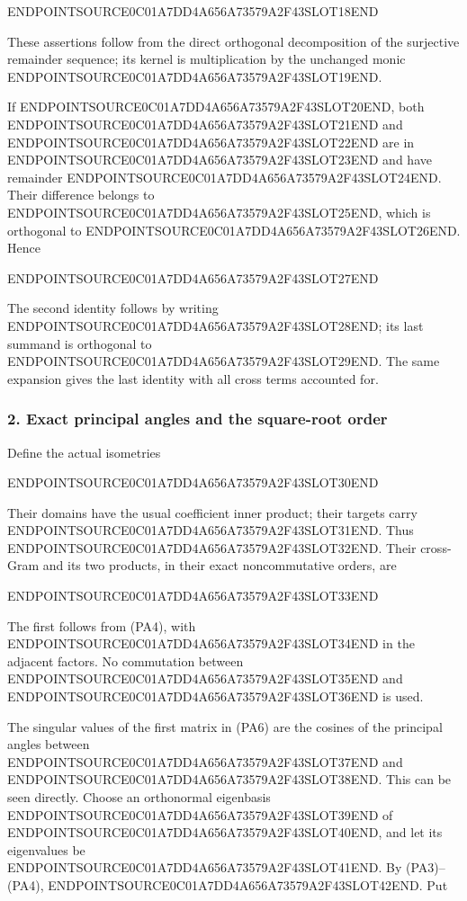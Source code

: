 ENDPOINTSOURCE0C01A7DD4A656A73579A2F43SLOT18END

These assertions follow from the direct orthogonal decomposition of the surjective remainder sequence; its kernel is multiplication by the unchanged monic ENDPOINTSOURCE0C01A7DD4A656A73579A2F43SLOT19END.

If ENDPOINTSOURCE0C01A7DD4A656A73579A2F43SLOT20END, both ENDPOINTSOURCE0C01A7DD4A656A73579A2F43SLOT21END and ENDPOINTSOURCE0C01A7DD4A656A73579A2F43SLOT22END are in ENDPOINTSOURCE0C01A7DD4A656A73579A2F43SLOT23END and have remainder ENDPOINTSOURCE0C01A7DD4A656A73579A2F43SLOT24END. Their difference belongs to ENDPOINTSOURCE0C01A7DD4A656A73579A2F43SLOT25END, which is orthogonal to ENDPOINTSOURCE0C01A7DD4A656A73579A2F43SLOT26END. Hence

ENDPOINTSOURCE0C01A7DD4A656A73579A2F43SLOT27END

The second identity follows by writing ENDPOINTSOURCE0C01A7DD4A656A73579A2F43SLOT28END; its last summand is orthogonal to ENDPOINTSOURCE0C01A7DD4A656A73579A2F43SLOT29END. The same expansion gives the last identity with all cross terms accounted for.

\subsubsection{2. Exact principal angles and the square-root order}\label{endpoint-principal_angle_volume_review--exact-principal-angles-and-the-square-root-order}

Define the actual isometries

ENDPOINTSOURCE0C01A7DD4A656A73579A2F43SLOT30END

Their domains have the usual coefficient inner product; their targets carry ENDPOINTSOURCE0C01A7DD4A656A73579A2F43SLOT31END. Thus ENDPOINTSOURCE0C01A7DD4A656A73579A2F43SLOT32END. Their cross-Gram and its two products, in their exact noncommutative orders, are

ENDPOINTSOURCE0C01A7DD4A656A73579A2F43SLOT33END

The first follows from (PA4), with ENDPOINTSOURCE0C01A7DD4A656A73579A2F43SLOT34END in the adjacent factors. No commutation between ENDPOINTSOURCE0C01A7DD4A656A73579A2F43SLOT35END and ENDPOINTSOURCE0C01A7DD4A656A73579A2F43SLOT36END is used.

The singular values of the first matrix in (PA6) are the cosines of the principal angles between ENDPOINTSOURCE0C01A7DD4A656A73579A2F43SLOT37END and ENDPOINTSOURCE0C01A7DD4A656A73579A2F43SLOT38END. This can be seen directly. Choose an orthonormal eigenbasis ENDPOINTSOURCE0C01A7DD4A656A73579A2F43SLOT39END of ENDPOINTSOURCE0C01A7DD4A656A73579A2F43SLOT40END, and let its eigenvalues be ENDPOINTSOURCE0C01A7DD4A656A73579A2F43SLOT41END. By (PA3)--(PA4), ENDPOINTSOURCE0C01A7DD4A656A73579A2F43SLOT42END. Put

